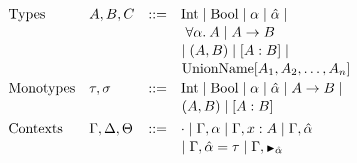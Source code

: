 \newcommand{\Inttype}{\text{Int}}
\newcommand{\Booltype}{\text{Bool}}
\begin{figure}[h]
  \centering
  \begin{minipage}{0.6\textwidth}
  \[
      \begin{array}{llcl}
      \text{Types} & A, B, C & \bnfas &
            \Inttype \bnfalt \Booltype \bnfalt \alpha \bnfalt \ahat \bnfalt 
            \\[1pt] &&&\!\!\!\;\;\;
            \alltype{\alpha}{A} \bnfalt A \arr B 
            \\[1pt] &&&\!\!\!\;\;
            \bnfalt (A, B) \bnfalt \TypeAlias{A}{B} \bnfalt  
            \\[1pt] &&&\!\!\!\;\;
            \Unionname[A_1, A_2, \dots, A_n]
      \\[2pt]
      \text{Monotypes} & \tau,\sigma & \bnfas &
            \Inttype \bnfalt \Booltype \bnfalt \alpha \bnfalt \ahat \bnfalt A \arr B \bnfalt
            \\[1pt] &&&\!\!\!\;\;
            (A, B) \bnfalt \TypeAlias{A}{B}
        \\[4pt]
      \text{Contexts} & \Gamma, \Delta, \Theta & \bnfas &
                  \cdot
                  \bnfalt \Gamma, \alpha 
                  \bnfalt \Gamma, x:A
                  \bnfalt \Gamma, \ahat
                  \\[1pt] &&&\!\!\!\;\;
                  \bnfalt \Gamma, \hypeq{\ahat}{\tau}
                  \bnfalt \Gamma, \MonnierComma{\ahat}
      \end{array}
  \]
  

\end{minipage}
\end{figure}
